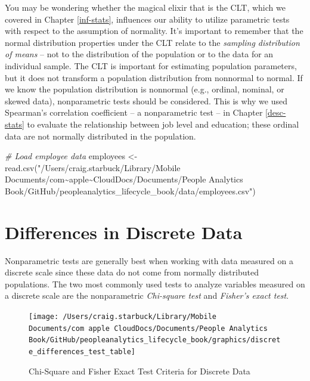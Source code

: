 \documentclass[
]{book}
\newenvironment{Shaded}{\begin{snugshade}}{\end{snugshade}}
\newcommand{\CommentTok}[1]{\textcolor[rgb]{0.56,0.35,0.01}{\textit{#1}}}
\newcommand{\FunctionTok}[1]{\textcolor[rgb]{0.00,0.00,0.00}{#1}}
\newcommand{\NormalTok}[1]{#1}
\newcommand{\OtherTok}[1]{\textcolor[rgb]{0.56,0.35,0.01}{#1}}
\newcommand{\StringTok}[1]{\textcolor[rgb]{0.31,0.60,0.02}{#1}}
\begin{document}
You may be wondering whether the magical elixir that is the CLT, which we covered in Chapter \ref{inf-stats}, influences our ability to utilize parametric tests with respect to the assumption of normality. It's important to remember that the normal distribution properties under the CLT relate to the \emph{sampling distribution of means} -- not to the distribution of the population or to the data for an individual sample. The CLT is important for estimating population parameters, but it does not transform a population distribution from nonnormal to normal. If we know the population distribution is nonnormal (e.g., ordinal, nominal, or skewed data), nonparametric tests should be considered. This is why we used Spearman's correlation coefficient -- a nonparametric test -- in Chapter \ref{desc-stats} to evaluate the relationship between job level and education; these ordinal data are not normally distributed in the population.

\begin{Shaded}
\begin{Highlighting}[]
\CommentTok{\# Load employee data}
\NormalTok{employees }\OtherTok{\textless{}{-}} \FunctionTok{read.csv}\NormalTok{(}\StringTok{"/Users/craig.starbuck/Library/Mobile Documents/com\textasciitilde{}apple\textasciitilde{}CloudDocs/Documents/People Analytics Book/GitHub/peopleanalytics\_lifecycle\_book/data/employees.csv"}\NormalTok{)}
\end{Highlighting}
\end{Shaded}

\hypertarget{differences-in-discrete-data}{%
\section{Differences in Discrete Data}\label{differences-in-discrete-data}}

Nonparametric tests are generally best when working with data measured on a discrete scale since these data do not come from normally distributed populations. The two most commonly used tests to analyze variables measured on a discrete scale are the nonparametric \emph{Chi-square test} and \emph{Fisher's exact test}.

\begin{figure}

{\centering \texttt{[image: /Users/craig.starbuck/Library/Mobile Documents/com~apple~CloudDocs/Documents/People Analytics Book/GitHub/peopleanalytics\_lifecycle\_book/graphics/discrete\_differences\_test\_table]} 

}

\caption{Chi-Square and Fisher Exact Test Criteria for Discrete Data}\label{fig:discrete-tests}
\end{figure}
\end{document}
